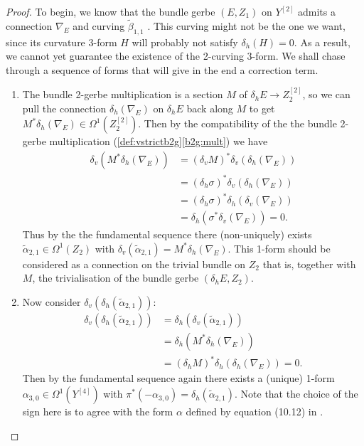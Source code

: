 \documentclass[12pt]{amsart}
\theoremstyle{plain}
\theoremstyle{definition}
\theoremstyle{remark}
\numberwithin{equation}{section}
\newcommand{\<}{\langle}
\renewcommand{\>}{\rangle}
\begin{document}
\begin{proof}
To begin, we know that the bundle gerbe $(E,Z_1)$ on $Y^{[2]}$ admits a connection $\nabla_E$ and curving $\widetilde\beta_{1,1}$ \cite{Mur}. 
This curving might not be the one we want, since its curvature 3-form $H$ will probably not satisfy $\delta_h (H) = 0$. 
As a result, we cannot yet guarantee the existence of the 2-curving 3-form. 
We shall chase through a sequence of forms that will give in the end a correction term.

\begin{enumerate}

\item The bundle 2-gerbe multiplication is a section $M$ of $\delta_h E \to Z_2^{[2]}$, so we can pull the connection $\delta_h(\nabla_E)$ on $\delta_hE$ back along $M$ to get $M^*\delta_h(\nabla_E) \in \Omega^1(Z_2^{[2]})$. Then by the compatibility of the the bundle 2-gerbe multiplication (\ref{def:vstrictb2g}\eqref{b2g:mult}) we have
\begin{align*}	
\delta_v(M^*\delta_h(\nabla_E)) & = (\delta_v M)^*\delta_v(\delta_h(\nabla_E))\\
						 & = (\delta_h\sigma)^*\delta_v(\delta_h(\nabla_E))\\
						 & = (\delta_h\sigma)^*\delta_h(\delta_v(\nabla_E))\\
						 & = \delta_h(\sigma^*\delta_v(\nabla_E)) = 0.
\end{align*}
Thus by the the fundamental sequence there (non-uniquely) exists $\tilde\alpha_{2,1}\in \Omega^1(Z_2)$ with $\delta_v(\tilde\alpha_{2,1}) = M^*\delta_h(\nabla_E)$.
This 1-form should be considered as a connection on the trivial bundle on $Z_2$ that is, together with $M$, the trivialisation of the bundle gerbe $(\delta_hE,Z_2)$.


\item Now consider $\delta_v(\delta_h(\tilde\alpha_{2,1}))$:
\begin{align*}
\delta_v(\delta_h(\tilde\alpha_{2,1})) & = \delta_h(\delta_v(\tilde\alpha_{2,1})) \\
& = \delta_h(M^*\delta_h(\nabla_E))\\
& = (\delta_hM)^*\delta_h(\delta_h(\nabla_E)) = 0.
\end{align*}
Then by the fundamental sequence again there exists a (unique) 1-form $\alpha_{3,0} \in \Omega^1(Y^{[4]})$ with $\pi^*(-\alpha_{3,0}) = \delta_h(\tilde\alpha_{2,1})$. Note that the choice of the sign here is to agree with the form $\alpha$ defined by equation (10.12) in \cite{StevPhD}.


\end{enumerate}
\end{proof}
\end{document}
